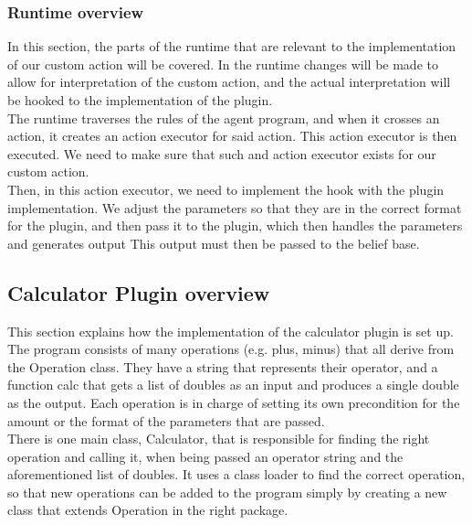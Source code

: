 \subsubsection{Runtime overview}
In this section, the parts of the runtime that are relevant to the implementation of our custom action will be covered. In the runtime changes will be made to allow for interpretation of the custom action, and the actual interpretation will be hooked to the implementation of the plugin. \\ 

The runtime traverses the rules of the agent program, and when it crosses an action, it creates an action executor for said action. This action executor is then executed. We need to make sure that such and action executor exists for our custom action. \\ 

Then, in this action executor, we need to implement the hook with the plugin implementation. We adjust the parameters so that they are in the correct format for the plugin, and then pass it to the plugin, which then handles the parameters and generates output This output must then be passed to the belief base.

\subsection{Calculator Plugin overview}
This section explains how the implementation of the calculator plugin is set up. \\ 

The program consists of many operations (e.g. plus, minus) that all derive from the Operation class. They have a string that represents their operator, and a function calc that gets a list of doubles as an input and produces a single double as the output. Each operation is in charge of setting its own precondition for the amount or the format of the parameters that are passed. \\ 

There is one main class, Calculator, that is responsible for finding the right operation and calling it, when being passed an operator string and the aforementioned list of doubles. It uses a class loader to find the correct operation, so that new operations can be added to the program simply by creating a new class that extends Operation in the right package. \\ 